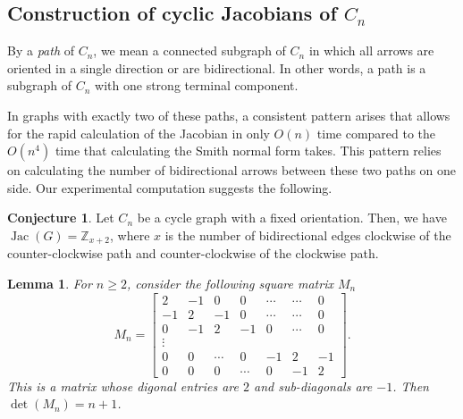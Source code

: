 \documentclass[11pt,reqno]{amsart}
\DeclareMathOperator{\Jac}{Jac}
\theoremstyle{definition}
\newtheorem{conj}[mydef]{Conjecture}
\theoremstyle{plain}
\newtheorem{lemma}[mydef]{Lemma}
\begin{document}
	

\subsection{Construction of cyclic Jacobians of $C_n$}
By a \textit{path} of $C_n$, we mean a connected subgraph of $C_n$ in which all arrows are oriented in a single direction or are bidirectional. In other words, a path is a subgraph of $C_n$ with one strong terminal component. 
				
In graphs with exactly two of these paths, a consistent pattern arises that allows for the rapid calculation of the Jacobian in only $O(n)$ time compared to the $O(n^4)$ time that calculating the Smith normal form takes. This pattern relies on calculating the number of bidirectional arrows between these two paths on one side. Our experimental computation suggests the following. 

		\begin{conj}\label{conjecture: two path}
			Let $C_n$ be a cycle graph with a fixed orientation. Then, we have $\Jac(G)=\mathbb{Z}_{x+2}$, where $x$ is the number of bidirectional edges clockwise of the counter-clockwise path and counter-clockwise of the clockwise path.
		\end{conj}


		\begin{lemma} \label{obj3}
			For $n \ge 2$, consider the following square matrix $M_n$
			\begin{equation}
				M_n = \begin{bmatrix}
					2 & -1 & 0 & 0& \cdots & \cdots & 0 \\
					-1 & 2 & -1& 0& \cdots &\cdots & 0 \\
					0 & -1 & 2 & -1 & 0& \cdots & 0 \\
					\vdots \\
					0 & 0 & \cdots& 0 & -1 & 2 & -1 \\
					0 & 0 &0 & \cdots & 0 &  -1 & 2 
					\end{bmatrix}.
			\end{equation}
			This is a matrix whose digonal entries are $2$ and sub-diagonals are $-1$. Then $\det (M_n) = n+1$. 
		\end{lemma}
		
\end{document}
